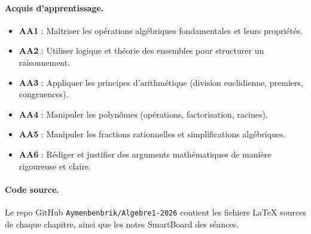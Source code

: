 \documentclass[12pt,a4paper,openright]{report}
\theoremstyle{definition}
\theoremstyle{remark}
\begin{document}
\paragraph{Acquis d'apprentissage.}
\begin{itemize}
    \item \textbf{AA1} : Maîtriser les opérations algébriques fondamentales et leurs propriétés.
    \item \textbf{AA2} : Utiliser logique et théorie des ensembles pour structurer un raisonnement.
    \item \textbf{AA3} : Appliquer les principes d'arithmétique (division euclidienne, premiers, congruences).
    \item \textbf{AA4} : Manipuler les polynômes (opérations, factorisation, racines).
    \item \textbf{AA5} : Manipuler les fractions rationnelles et simplifications algébriques.
    \item \textbf{AA6} : Rédiger et justifier des arguments mathématiques de manière rigoureuse et claire.
\end{itemize}

\paragraph{Code source.} Le repo GitHub \texttt{Aymenbenbrik/Algebre1-2026} contient les fichiers \LaTeX{} sources de chaque chapitre, ainsi que les notes SmartBoard des séances.

\tableofcontents







\end{document}
